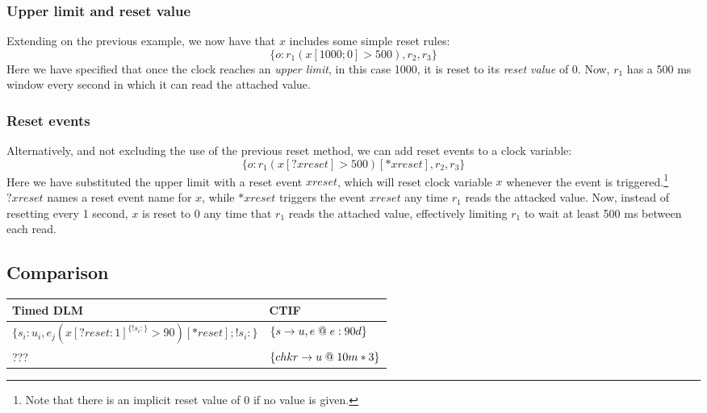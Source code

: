 \subsubsection{Upper limit and reset value}
Extending on the previous example, we now have that $x$ includes some simple reset rules:
  \[ \{ o : r_1(x[1000;0] > 500), r_2, r_3 \} \]
Here we have specified that once the clock reaches an \emph{upper limit}, in this case 1000, it is reset to its \emph{reset value} of 0.
Now, $r_1$ has a 500 ms window every second in which it can read the attached value.

\subsubsection{Reset events}
Alternatively, and not excluding the use of the previous reset method, we can add reset events to a clock variable:
  \[ \{ o : r_1(x[?xreset] > 500)[*xreset], r_2, r_3 \} \]
Here we have substituted the upper limit with a reset event $xreset$, which will reset clock variable $x$ whenever the event is triggered.\footnote{Note that there is an implicit reset value of 0 if no value is given.}
$?xreset$ names a reset event name for $x$, while $*xreset$ triggers the event $xreset$ any time $r_1$ reads the attacked value.
Now, instead of resetting every 1 second, $x$ is reset to 0 any time that $r_1$ reads the attached value, effectively limiting $r_1$ to wait at least 500 ms between each read.

\subsection{Comparison}

\begin{tabular}{|l|l|}
  \hline
  Timed DLM & CTIF \\ \hline
  $\{s_i : u_i, e_j (x[?reset : 1]^{\{ !s_i: \}} > 90)[*reset]; !s_i: \}$ & $\{s \rightarrow u, e \;@\; e: 90d \}$ \\ \hline
  ??? & $\{ chkr \rightarrow u \;@\; 10m * 3 \}$ \\ \hline

\end{tabular}

